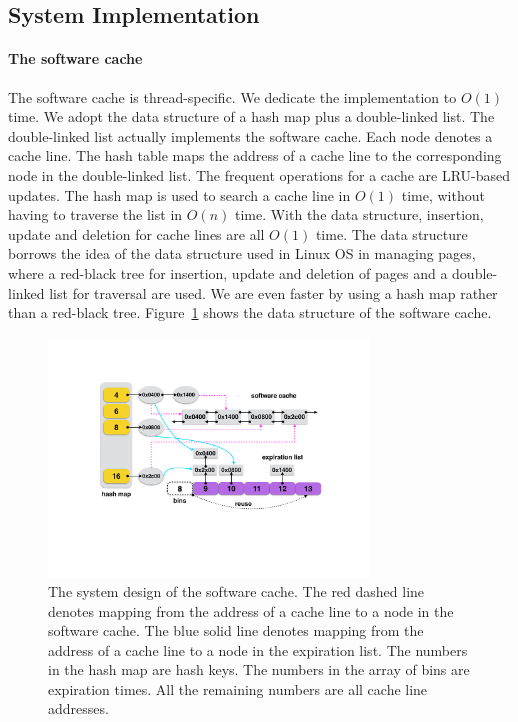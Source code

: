 \documentclass[preprint,nocopyrightspace,10pt]{sigplanconf}
\begin{document}
\subsection{System Implementation}

\paragraph{The software cache} 
The software cache is thread-specific. We dedicate the implementation to $O(1)$ time.
We adopt the data structure of a hash map plus a double-linked list. The
double-linked list actually implements the software cache. Each node 
denotes a cache line. The hash table maps the address of a cache line 
to the corresponding node in the double-linked list. The frequent operations 
for a cache are LRU-based updates. The hash map is used to search a cache 
line in $O(1)$ time, without having to traverse the list in $O(n)$ time. With 
the data structure, insertion, update and deletion for cache lines are all $O(1)$ 
time. The data structure borrows the idea of the data structure used in Linux 
OS in managing pages, where a red-black tree for insertion, update and deletion 
of pages and a double-linked list for traversal are used. We are even faster 
by using a hash map rather than a red-black tree. Figure~\ref{fig:system}
shows the data structure of the software cache.

\begin{figure}[hbpt]
\centering
\includegraphics[width=8.5cm]{figures/system.pdf}
\caption{The system design of the software cache. The red dashed line denotes 
mapping from the address of a cache line to a node in the software cache. The blue
solid line denotes mapping from the address of a cache line to a node in the expiration
list. The numbers in the hash map are hash keys. The numbers in the array of bins are
expiration times. All the remaining numbers are all cache line addresses.}
\label{fig:system}
\end{figure}
\end{document}
